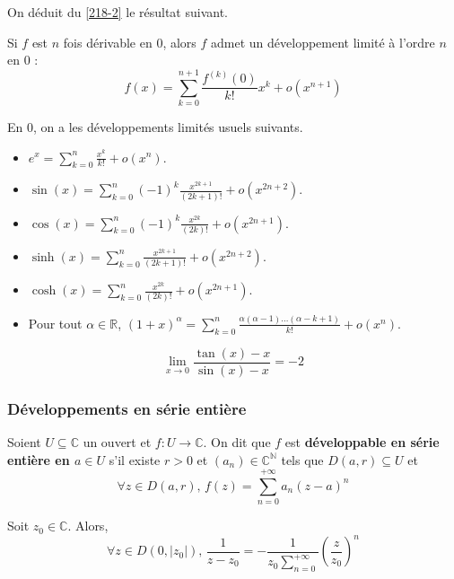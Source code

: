 	On déduit du \cref{218-2} le résultat suivant.

	\begin{proposition}
		Si $f$ est $n$ fois dérivable en $0$, alors $f$ admet un développement limité à l'ordre $n$ en $0$ :
		\[ f(x) = \sum_{k=0}^{n+1} \frac{f^{(k)} (0)}{k!} x^k + o(x^{n+1}) \]
	\end{proposition}

	\begin{example}
		En $0$, on a les développements limités usuels suivants.
		\begin{itemize}
			\item $e^x = \sum_{k=0}^{n} \frac{x^k}{k!} + o(x^n)$.
			\item $\sin(x) = \sum_{k=0}^{n} (-1)^{k} \frac{x^{2k+1}}{(2k+1)!} + o(x^{2n+2})$.
			\item $\cos(x) = \sum_{k=0}^{n} (-1)^{k} \frac{x^{2k}}{(2k)!} + o(x^{2n+1})$.
			\item $\sinh(x) = \sum_{k=0}^{n} \frac{x^{2k+1}}{(2k+1)!} + o(x^{2n+2})$.
			\item $\cosh(x) = \sum_{k=0}^{n} \frac{x^{2k}}{(2k)!} + o(x^{2n+1})$.
			\item Pour tout $\alpha \in \mathbb{R}$, $(1+x)^\alpha = \sum_{k=0}^n \frac{\alpha(\alpha - 1) \dots (\alpha -k+1)}{k!} + o(x^n)$.
		\end{itemize}
	\end{example}

	\begin{application}
		\[ \lim_{x \rightarrow 0} \frac{\tan(x) - x}{\sin(x) - x} = -2 \]
	\end{application}

	\subsubsection{Développements en série entière}


	\begin{definition}
		Soient $U \subseteq \mathbb{C}$ un ouvert et $f : U \rightarrow \mathbb{C}$. On dit que $f$ est \textbf{développable en série entière en $a \in U$} s'il existe $r > 0$ et $(a_n) \in \mathbb{C}^{\mathbb{N}}$ tels que $D(a, r) \subseteq U$ et
		\[ \forall z \in D(a, r), \, f(z) = \sum_{n=0}^{+\infty} a_n (z-a)^n \]
	\end{definition}


	\begin{example}
		Soit $z_0 \in \mathbb{C}$. Alors,
		\[ \forall z \in D(0,\vert z_0 \vert), \, \frac{1}{z-z_0} = -\frac{1}{z_0 \sum_{n=0}^{+\infty}} \left( \frac{z}{z_0} \right)^n \]
	\end{example}

